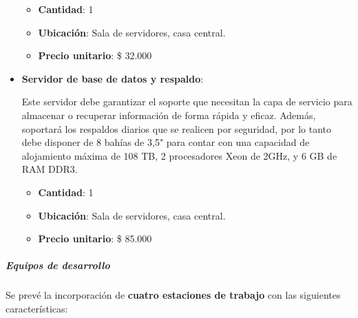 \begin{itemize}
        \begin{itemize}
            \item \textbf{Cantidad}: 1
            \item \textbf{Ubicación}: Sala de servidores, casa central.
            \item \textbf{Precio unitario}: \$ 32.000
        \end{itemize}
        
		\item \textbf{Servidor de base de datos y respaldo}:
        
        Este servidor debe garantizar el soporte que necesitan la capa de servicio para almacenar o recuperar información de forma rápida y eficaz.
        Además, soportará los respaldos diarios que se realicen por seguridad, por lo tanto debe disponer de 8 bahías de 3,5" para contar con una capacidad de alojamiento máxima de 108 TB, 2 procesadores Xeon de 2GHz, y 6 GB de RAM DDR3.
        
        \begin{itemize}
            \item \textbf{Cantidad}: 1
            \item \textbf{Ubicación}: Sala de servidores, casa central.
            \item \textbf{Precio unitario}: \$ 85.000
        \end{itemize}
        
	\end{itemize}


\subparagraph{Equipos de desarrollo}

	Se prevé la incorporación de \textbf{cuatro estaciones de trabajo} con las siguientes características:
    
